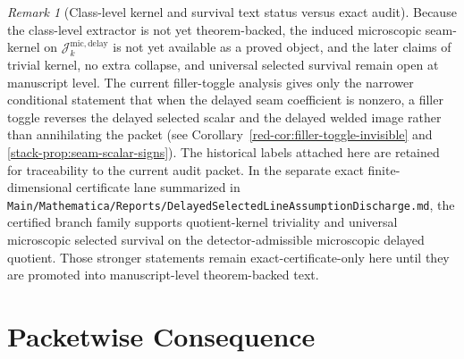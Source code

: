 \documentclass[11pt]{article}
\theoremstyle{definition}
\theoremstyle{plain}
\theoremstyle{remark}
\newtheorem{remark}[definition]{Remark}
\begin{document}
\begin{remark}[Class-level kernel and survival text status versus exact audit]
\label{def:mic-seam-kernel}
\label{prop:extractor-kernel-characterization}
\label{cor:extractor-injective-on-mic-delay-quotient}
\label{thm:promoted-delayed-no-extra-collapse}
\label{def:selected-surviving-micro}
\label{thm:universal-promoted-selected-survival}
\label{cor:global-blocker-now-transfers-to-postHLS}
Because the class-level extractor is not yet theorem-backed, the induced microscopic seam-kernel on
\(\mathcal J^{\mathrm{mic,delay}}_k\) is not yet available as a proved object, and the later claims
of trivial kernel, no extra collapse, and universal selected survival remain open at manuscript
level.
The current filler-toggle analysis gives only the narrower conditional statement that when the
delayed seam coefficient is nonzero, a filler toggle reverses the delayed selected scalar and the
delayed welded image rather than annihilating the packet
\textup{(see Corollary~\ref*{red-cor:filler-toggle-invisible} and \cref{stack-prop:seam-scalar-signs})}.
The historical labels attached here are retained for traceability to the current audit packet.
In the separate exact finite-dimensional certificate lane summarized in
\texttt{Main/Mathematica/Reports/DelayedSelectedLineAssumptionDischarge.md}, the certified branch
family supports quotient-kernel triviality and universal microscopic selected survival on the
detector-admissible microscopic delayed quotient.
Those stronger statements remain exact-certificate-only here until they are promoted into
manuscript-level theorem-backed text.
\end{remark}

\section{Packetwise Consequence}
\end{document}
